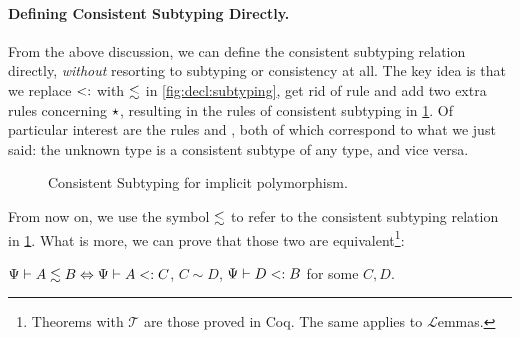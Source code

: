 \paragraph{Defining Consistent Subtyping Directly.}

From the above discussion, we can define the consistent subtyping relation
directly, \textit{without} resorting to subtyping or consistency at all. The key
idea is that we replace $<:$ with $\lesssim$ in
\cref{fig:decl:subtyping}, get rid of rule  and add two
extra rules concerning $\star$, resulting in the rules of consistent
subtyping in \cref{fig:decl:conssub}. Of particular interest are the rules
 and , both of which correspond to what we
just said: the unknown type is a consistent subtype of any type, and vice versa.
\begin{figure}[t]
  \begin{small}
  \end{small}
  \caption{Consistent Subtyping for implicit polymorphism.}
  \label{fig:decl:conssub}
\end{figure}
From now on, we use the symbol $\lesssim$ to refer to the consistent subtyping
relation in \cref{fig:decl:conssub}. What is more, we can prove that those two
are equivalent\footnote{Theorems with $\mathcal{T}$ are those
  proved in Coq. The same applies to $\mathcal{L}$emmas.}:

\begin{ctheorem}   \label{lemma:properties-conssub}
  $\Psi {} \vdash A \lesssim B  \Leftrightarrow \Psi {} \vdash A <: C$, $C \sim D$, $\Psi {} \vdash D <: B$ for some $C, D$.
\end{ctheorem}







